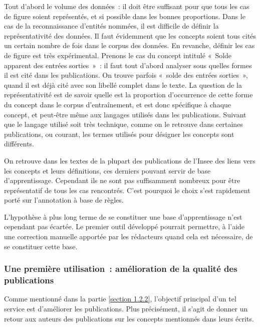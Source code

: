 Tout d'abord le volume des données~: il doit être suffisant pour que tous les cas de figure soient représentés, et si possible dans les bonnes proportions. Dans le cas de la reconnaissance d'entités nommées, il est difficile de définir la représentativité des données. Il faut évidemment que les concepts soient tous cités un certain nombre de fois dans le corpus des données. En revanche, définir les cas de figure est très expérimental. Prenons le cas du concept intitulé «~Solde apparent des entrées sorties~»~: il faut tout d'abord analyser sous quelles formes il est cité dans les publications. On trouve parfois «~solde des entrées sorties~», quand il est déjà cité avec son libellé complet dans le texte. La question de la représentativité est de savoir quelle est la proportion d'occurrence de cette forme du concept dans le corpus d'entraînement, et est donc spécifique à chaque concept, et peut-être même aux langages utilisés dans les publications. Suivant que le langage utilisé soit très technique, comme on le retrouve dans certaines publications, ou courant, les termes utilisés pour désigner les concepts sont différents.
\newline

On retrouve dans les textes de la plupart des publications de l'Insee des liens vers les concepts et leurs définitions, ces derniers pouvant servir de base d'apprentissage. Cependant ils ne sont pas suffisamment nombreux pour être représentatif de tous les cas rencontrés. C'est pourquoi le choix s'est rapidement porté sur l'annotation à base de règles.
\newline

L'hypothèse à plus long terme de se constituer une base d'apprentissage n'est cependant pas écartée. Le premier outil développé pourrait permettre, à l'aide une correction manuelle apportée par les rédacteurs quand cela est nécessaire, de se constituer cette base.
\label{section 2.1.2 - Méthodes de REN}

\subsubsection{Une première utilisation~: amélioration de la qualité des publications}
Comme mentionné dans la partie \ref{section 1.2.2}, l'objectif principal d'un tel service est d'améliorer les publications. Plus précisément, il s'agit de donner un retour aux auteurs des publications sur les concepts mentionnés dans leurs écrits. 
\newline

